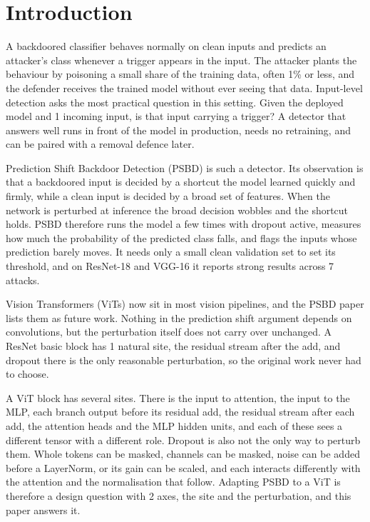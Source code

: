 \section{Introduction}
\label{sec:intro}

A backdoored classifier behaves normally on clean inputs and predicts an attacker's class whenever a trigger appears in the input. The attacker plants the behaviour by poisoning a small share of the training data, often 1\% or less, and the defender receives the trained model without ever seeing that data. Input-level detection asks the most practical question in this setting. Given the deployed model and 1 incoming input, is that input carrying a trigger? A detector that answers well runs in front of the model in production, needs no retraining, and can be paired with a removal defence later.

Prediction Shift Backdoor Detection (PSBD) \cite{li2025psbd} is such a detector. Its observation is that a backdoored input is decided by a shortcut the model learned quickly and firmly, while a clean input is decided by a broad set of features. When the network is perturbed at inference the broad decision wobbles and the shortcut holds. PSBD therefore runs the model a few times with dropout active, measures how much the probability of the predicted class falls, and flags the inputs whose prediction barely moves. It needs only a small clean validation set to set its threshold, and on ResNet-18 and VGG-16 it reports strong results across 7 attacks.

Vision Transformers (ViTs) \cite{dosovitskiy2021an} now sit in most vision pipelines, and the PSBD paper lists them as future work. Nothing in the prediction shift argument depends on convolutions, but the perturbation itself does not carry over unchanged. A ResNet basic block has 1 natural site, the residual stream after the add, and dropout there is the only reasonable perturbation, so the original work never had to choose.

A ViT block has several sites. There is the input to attention, the input to the MLP, each branch output before its residual add, the residual stream after each add, the attention heads and the MLP hidden units, and each of these sees a different tensor with a different role. Dropout is also not the only way to perturb them. Whole tokens can be masked, channels can be masked, noise can be added before a LayerNorm, or its gain can be scaled, and each interacts differently with the attention and the normalisation that follow. Adapting PSBD to a ViT is therefore a design question with 2 axes, the site and the perturbation, and this paper answers it.

